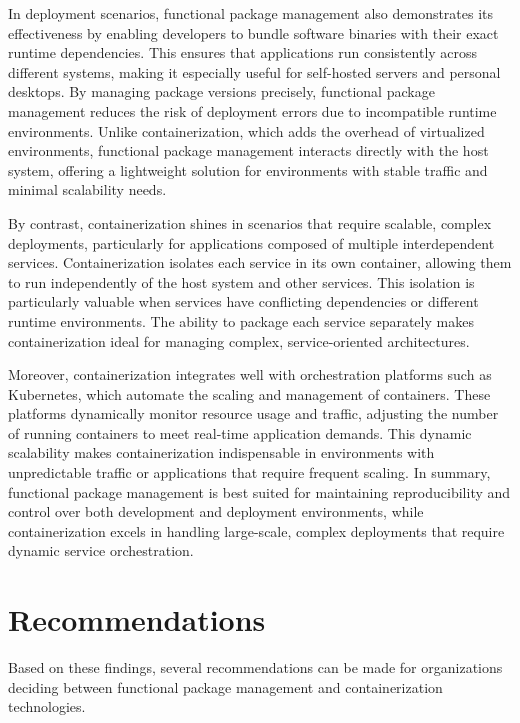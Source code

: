 In deployment scenarios, functional package management also demonstrates its effectiveness 
by enabling developers to bundle software binaries with their exact runtime dependencies. 
This ensures that applications run consistently across different systems, making it especially 
useful for self-hosted servers and personal desktops. By managing package versions precisely, 
functional package management reduces the risk of deployment errors due to incompatible 
runtime environments. Unlike containerization, which adds the overhead of virtualized 
environments, functional package management interacts directly with the host system, offering 
a lightweight solution for environments with stable traffic and minimal scalability needs.

By contrast, containerization shines in scenarios that require scalable, complex deployments, 
particularly for applications composed of multiple interdependent services. Containerization 
isolates each service in its own container, allowing them to run independently of the host 
system and other services. This isolation is particularly valuable when services have conflicting 
dependencies or different runtime environments. The ability to package each service separately 
makes containerization ideal for managing complex, service-oriented architectures.

Moreover, containerization integrates well with orchestration platforms such as Kubernetes, 
which automate the scaling and management of containers. These platforms dynamically monitor 
resource usage and traffic, adjusting the number of running containers to meet real-time 
application demands. This dynamic scalability makes containerization indispensable in 
environments with unpredictable traffic or applications that require frequent scaling. 
In summary, functional package management is best suited for maintaining reproducibility 
and control over both development and deployment environments, while containerization excels 
in handling large-scale, complex deployments that require dynamic service orchestration.

\section{Recommendations}
Based on these findings, several recommendations can be made for organizations deciding 
between functional package management and containerization technologies.


